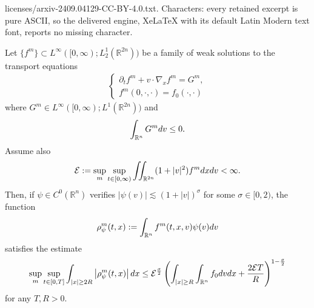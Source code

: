 \documentclass[10pt,a4paper]{amsart}
\newcommand{\R}{\mathbb{R}}
\newcommand{\dv}{\textnormal{d}v}
\newcommand{\dx}{\textnormal{d}x}
\newcommand{\intr}{\int_{\R^n}}
\newcommand{\lt}{\left}
\newcommand{\p}{\partial}
\newcommand{\rt}{\right}
\begin{document}
licenses/arxiv-2409.04129-CC-BY-4.0.txt. Characters: every retained excerpt is pure ASCII, so the delivered engine, XeLaTeX with its default Latin Modern text font, reports no missing character.
\begin{lemma}\label{lem:tight}
    Let $\{f^m\} \subset L^\infty([0,\infty);L^1_2(\R^{2n}))$ be a family of weak solutions to the transport equations
    \begin{align}
    \label{eq : transport m}
        \begin{cases}
        \p_t f^m + v\cdot \nabla_x f^m =G^m,\\
        f^m(0,\cdot,\cdot) = f_0(\cdot,\cdot)
        \end{cases}
    \end{align}
    where $G^m \in L^\infty([0,\infty);L^1(\R^{2n}))$ and
    \begin{align}
    \label{eq : collision sign}
        \int_{\R^n} G^m \dv \le 0.
    \end{align}
    Assume also
    \begin{equation*}
        \mathcal{E} := \sup_{m} \sup_{t\in [0,\infty)} \iint_{\R^{2n}} (1+|v|^2)f^m \dx \dv < \infty.
    \end{equation*}
    Then, if $\psi\in C^0(\R^n)$ verifies $|\psi(v)| \lesssim (1+|v|)^\sigma$
    for some $\sigma\in [0,2)$, the function
    \[
    \rho^m_\psi(t,x): = \intr f^m(t,x,v) \psi(v) \dv
    \]
    satisfies the estimate
\[
\sup_{m}\sup_{t \in [0,T]}\int_{|x|\ge 2R} \left|\rho_{\psi}^{m}(t,x)\right| \dx \le \mathcal{E}^{\frac{\sigma}{2}}\lt(\int_{|x|\ge R} \int_{\R^n} f_0 \dv \dx + \frac{2\mathcal{E}T}{R}\rt)^{1-\frac{\sigma}{2}}
\]  
for any $T,R>0$.
\end{lemma}
\end{document}
